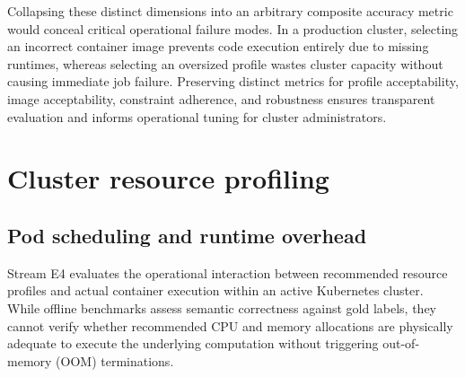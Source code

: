 Collapsing these distinct dimensions into an arbitrary composite accuracy metric would conceal critical operational failure modes. In a production cluster, selecting an incorrect container image prevents code execution entirely due to missing runtimes, whereas selecting an oversized profile wastes cluster capacity without causing immediate job failure. Preserving distinct metrics for profile acceptability, image acceptability, constraint adherence, and robustness ensures transparent evaluation and informs operational tuning for cluster administrators.

\section{Cluster resource profiling}
\label{sec:cluster_resource_eval}

\subsection{Pod scheduling and runtime overhead}
\label{subsec:e4_cluster_trials}
\label{subsec:e4_results}

Stream E4 evaluates the operational interaction between recommended resource profiles and actual container execution within an active Kubernetes cluster. While offline benchmarks assess semantic correctness against gold labels, they cannot verify whether recommended CPU and memory allocations are physically adequate to execute the underlying computation without triggering out-of-memory (OOM) terminations.

